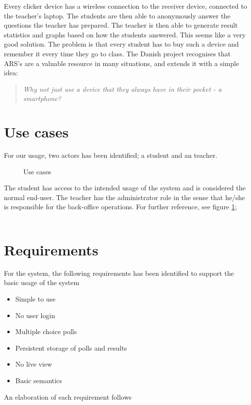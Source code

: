 \documentclass{acm_proc_article-sp}
\begin{document}
Every clicker device has a wireless connection to the receiver device, connected to the teacher’s laptop. The students are then able to anonymously answer the questions the teacher has prepared. The teacher is then able to generate result statistics and graphs based on how the students answered. This seems like a very good solution. The problem is that every student has to buy such a device and remember it every time they go to class. The Danish project recognises that ARS’s are a valuable resource in many situations, and extends it with a simple idea:

\begin{quote}
\textit{Why not just use a device that they always have in their pocket - a smartphone?}
\end{quote}


%


\section{Use cases}
\thispagestyle{fancy}%

For our usage, two actors has been identified; a student and an teacher.
\begin{figure}[h]
\centering
{}
\caption{Use cases}
\label{fig:use_cases}
\end{figure}
The student has access to the intended usage of the system and is considered the normal end-user. The teacher has the administrator role in the sense that he/she is responsible for the back-office operations. For further reference, see figure \ref{fig:use_cases};\\\\

\section{Requirements}
For the system, the following requirements has been identified to support the basic usage of the system
\begin{itemize}
  \item Simple to use
  \item No user login
  \item Multiple choice polls
  \item Persistent storage of polls and results
  \item No live view
  \item Basic semantics
\end{itemize}
An elaboration of each requirement follows
\end{document}

